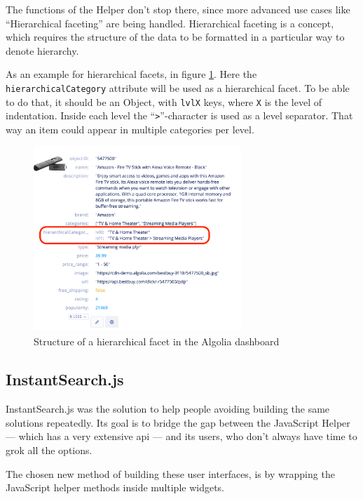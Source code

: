 The functions of the Helper don't stop there, since more advanced use cases like ``Hierarchical faceting''\cite{hierarchical-faceting} are being handled. Hierarchical faceting is a concept, which requires the structure of the data to be formatted in a particular way to denote hierarchy. 

As an example for hierarchical facets, in figure \ref{figure:hierarchical-facets}. Here the {\tt hierarchicalCategory} \gls{attribute} will be used as a hierarchical facet. To be able to do that, it should be an Object, with {\tt lvlX} keys, where {\tt X} is the level of indentation. Inside each level the ``{\tt >}''-character is used as a level separator. That way an item could appear in multiple categories per level.

\begin{figure}[H]
  \centering
  \includegraphics[width=0.7\textwidth]{../assets/hierarchical-dashboard.png}
  \caption{Structure of a hierarchical facet in the Algolia dashboard}
  \label{figure:hierarchical-facets}
\end{figure}


\subsection{InstantSearch.js} %
\label{sub:instantsearch_js}

InstantSearch.js was the solution to help people avoiding building the same solutions repeatedly. Its goal is to bridge the gap between the JavaScript Helper --- which has a very extensive \acrshort{api} --- and its users, who don't always have time to grok all the options.

The chosen new method of building these user interfaces, is by wrapping the JavaScript helper methods inside multiple widgets. %

